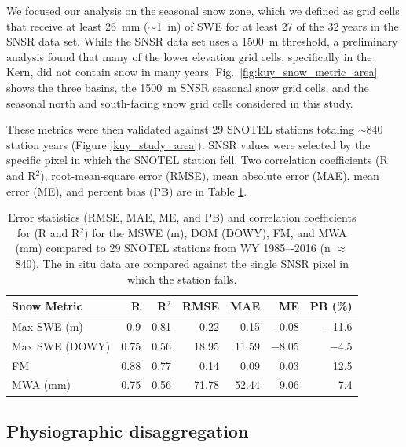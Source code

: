 We focused our analysis on the seasonal snow zone, which we defined as grid cells that receive at least 26~mm ($\sim$1~in) of SWE for at least 27 of the 32 years in the SNSR data set. While the SNSR data set uses a 1500~m threshold, a preliminary analysis found that many of the lower elevation grid cells, specifically in the Kern, did not contain snow in many years. Fig.~\ref{fig:kuy_snow_metric_area} shows the three basins, the 1500~m SNSR seasonal snow grid cells, and the seasonal north and south-facing snow grid cells considered in this study.

These metrics were then validated against 29 SNOTEL stations totaling $\sim$840 station years (Figure \ref{kuy_study_area}). SNSR values were selected by the specific pixel in which the SNOTEL station fell. Two correlation coefficients (R and R$^{2}$), root-mean-square error (RMSE), mean absolute error (MAE), mean error (ME), and percent bias (PB) are in Table \ref{tab:snow_metrics_val_table}.


\begin{table}[htbp]
  \centering
  \caption{Error statistics (RMSE, MAE, ME, and PB) and correlation coefficients for (R and R$^{2}$) for the MSWE (m), DOM (DOWY), FM, and MWA (mm) compared to 29 SNOTEL stations from WY 1985–-2016 (n $\approx$ 840). The in situ data are compared against the single SNSR pixel in which the station falls.}
  \label{tab:snow_metrics_val_table}
  \begin{tabular}{lrrrrrr}
    \toprule
    Snow Metric & R & R$^{2}$ & RMSE & MAE & ME & PB (\%) \\
    \midrule
    Max SWE (m) & 0.9 & 0.81 & 0.22 & 0.15 & $-$0.08 & $-$11.6 \\
    Max SWE (DOWY) & 0.75 & 0.56 & 18.95 & 11.59 & $-$8.05 & $-$4.5 \\
    FM & 0.88 & 0.77 & 0.14 & 0.09 & 0.03 & 12.5 \\
    MWA (mm) & 0.75 & 0.56 & 71.78 & 52.44 & 9.06 & 7.4 \\
    \bottomrule
  \end{tabular}
\end{table}

\hypertarget{ch2-methods-2}{\subsection{Physiographic disaggregation}\label{ch2-methods-2}}

